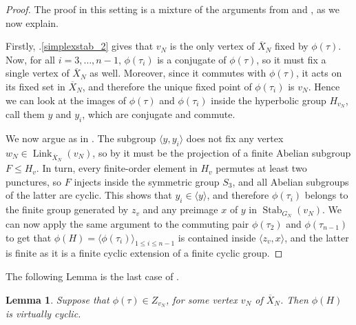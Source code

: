 \documentclass[svgnames]{amsart}
\theoremstyle{plain}
\newtheorem{lem}[thm]{Lemma}
\theoremstyle{definition}
\newcommand{\link}[2]{\operatorname{Link}_{#1}\left(#2\right)}
\newcommand{\Stab}[2]{\operatorname{Stab}_{#1}\left(#2\right)}
\newcommand{\ov}[1]{\overline{#1}}
\begin{document}
\begin{proof} The proof in this setting is a mixture of the arguments from  and , as we now explain. 

Firstly, .\eqref{simplexstab_2} gives that $v_N$ is the only vertex of $\ov X_N$ fixed by $\phi(\tau)$. Now, for all $i=3,\ldots, n-1$, $\phi(\tau_{i})$ is a conjugate of $\phi(\tau)$, so it must fix a single vertex of $\ov X_N$ as well. Moreover, since it commutes with $\phi(\tau)$, it acts on its fixed set in $\ov X_N$, and therefore the unique fixed point of $\phi(\tau_i)$ is $v_N$. Hence we can look at the images of $\phi(\tau)$ and $\phi(\tau_i)$ inside the hyperbolic group $H_{v_N}$, call them $y$ and $y_i$, which are conjugate and commute.

We now argue as in . The subgroup $\langle y,y_i\rangle$ does not fix any vertex $w_N\in \link{\ov X_N}{v_N}$, so by  it must be the projection of a finite Abelian subgroup $F\le H_v$. In turn, every finite-order element in $H_v$ permutes at least two punctures, so $F$ injects inside the symmetric group $S_3$, and all Abelian subgroups of the latter are cyclic. This shows that $y_i\in \langle y\rangle$, and therefore $\phi(\tau_i)$ belongs to the finite group generated by $z_v$ and any preimage $x$ of $y$ in $\Stab{G_N}{v_N}$. We can now apply the same argument to the commuting pair $\phi(\tau_2)$ and $\phi(\tau_{n-1})$ to get that $\phi(H)=\langle \phi(\tau_i)\rangle_{1\le i\le n-1}$ is contained inside $\langle z_v, x\rangle$, and the latter is finite as it is a finite cyclic extension of a finite cyclic group.
\end{proof}

\noindent The following Lemma is the last case of  .
\begin{lem}\label{lem:phi_is_dehn}
    Suppose that $\phi(\tau)\in Z_{v_N}$, for some vertex $v_N$ of $\ov X_N$. Then $\phi(H)$ is virtually cyclic.
\end{lem}
\end{document}
